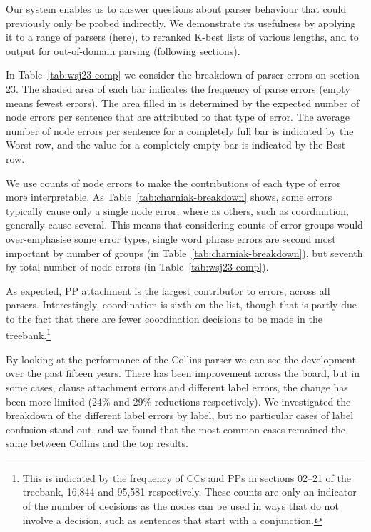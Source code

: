 Our system enables us to answer questions about parser behaviour that could previously only be probed indirectly.
We demonstrate its usefulness by applying it to a range of parsers (here), to reranked K-best lists of various lengths, and to output for out-of-domain parsing (following sections).

\begin{landscape}





\end{landscape}

In Table~\ref{tab:wsj23-comp} we consider the breakdown of parser errors on \wsj section 23.
The shaded area of each bar indicates the frequency of parse errors (\myie empty means fewest errors).
The area filled in is determined by the expected number of node errors per sentence that are attributed to that type of error.
The average number of node errors per sentence for a completely full bar is indicated by the Worst row, and the value for a completely empty bar is indicated by the Best row.

We use counts of node errors to make the contributions of each type of error more interpretable.
As Table~\ref{tab:charniak-breakdown} shows, some errors typically cause only a single node error, where as others, such as coordination, generally cause several.
This means that considering counts of error groups would over-emphasise some error types, \myeg single word phrase errors are second most important by number of groups (in Table~\ref{tab:charniak-breakdown}), but seventh by total number of node errors (in Table~\ref{tab:wsj23-comp}).

As expected, PP attachment is the largest contributor to errors, across all parsers.
Interestingly, coordination is sixth on the list, though that is partly due to the fact that there are fewer coordination decisions to be made in the treebank.\footnote{This is indicated by the frequency of CCs and PPs in sections 02--21 of the treebank, 16,844 and 95,581 respectively.
These counts are only an indicator of the number of decisions as the nodes can be used in ways that do not involve a decision, such as sentences that start with a conjunction.}

By looking at the performance of the Collins parser we can see the development
over the past fifteen years.  There has been improvement across
the board, but in some cases, \myeg clause attachment errors and different label
errors, the change has been more limited (24\% and 29\% reductions respectively).  We
investigated the breakdown of the different label errors by label, but no
particular cases of label confusion stand out, and we found that the most
common cases remained the same between Collins and the top results.

